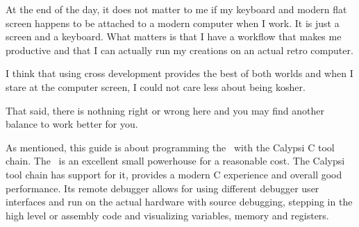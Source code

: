 At the end of the day, it does not matter to me if my keyboard and
modern flat screen happens to be attached to a modern computer when I
work. It is just a screen and a keyboard. What matters is that I have
a workflow that makes me productive and that I can actually run my
creations on an actual retro computer.

I think that using cross development provides the best of both worlds
and when I stare at the computer screen, I could not care less about
being kosher.

That said, there is nothning right or wrong here and you may find
another balance to work better for you.

As mentioned, this guide is about programming the \foenix\ with the
Calypsi C tool chain. The \foenix\ is an excellent small powerhouse
for a reasonable cost. The Calypsi tool chain has support for it,
provides a modern C experience and overall good performance. Its
remote debugger allows for using different debugger user interfaces
and run on the actual hardware with source debugging, stepping in the
high level or assembly code and visualizing variables, memory and
registers.
